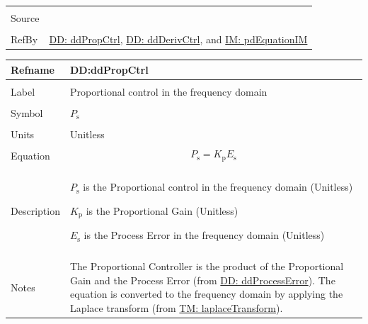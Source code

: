 \documentclass[12pt]{article}
\begin{document}
\begin{minipage}{\textwidth}
\begin{tabular}{>{\raggedright}p{}>{\raggedright\arraybackslash}p{}}
\\ \midrule \\
Source & \cite{johnson2008}
         
\\ \midrule \\
RefBy & \hyperref[DD:ddPropCtrl]{DD: ddPropCtrl}, \hyperref[DD:ddDerivCtrl]{DD: ddDerivCtrl}, and \hyperref[IM:pdEquationIM]{IM: pdEquationIM}
        
\\ \bottomrule
\end{tabular}
\end{minipage}

\vspace{\baselineskip}
\noindent
\begin{minipage}{\textwidth}
\begin{tabular}{>{\raggedright}p{}>{\raggedright\arraybackslash}p{}}
\toprule \textbf{Refname} & \textbf{DD:ddPropCtrl}
\label{DD:ddPropCtrl}
\\ \midrule \\
Label & Proportional control in the frequency domain
        
\\ \midrule \\
Symbol & ${P_{\text{s}}}$
         
\\ \midrule \\
Units & Unitless
        
\\ \midrule \\
Equation & \begin{displaymath}
           {P_{\text{s}}}={K_{\text{p}}} {E_{\text{s}}}
           \end{displaymath}
\\ \midrule \\
Description & \begin{symbDescription}
              \item{${P_{\text{s}}}$ is the Proportional control in the frequency domain (Unitless)}
              \item{${K_{\text{p}}}$ is the Proportional Gain (Unitless)}
              \item{${E_{\text{s}}}$ is the Process Error in the frequency domain (Unitless)}
              \end{symbDescription}
\\ \midrule \\
Notes & The Proportional Controller is the product of the Proportional Gain and the Process Error (from \hyperref[DD:ddProcessError]{DD: ddProcessError}). The equation is converted to the frequency domain by applying the Laplace transform (from \hyperref[TM:laplaceTransform]{TM: laplaceTransform}).
        

\end{tabular}
\end{minipage}
\end{document}
